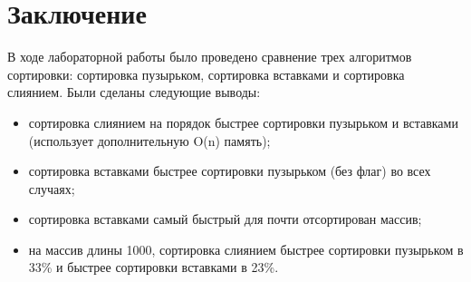 \chapter*{Заключение}

В ходе лабораторной работы было проведено сравнение трех алгоритмов сортировки:
сортировка пузырьком, сортировка вставками и сортировка слиянием.
Были сделаны следующие выводы:

\begin{itemize}
    \item сортировка слиянием на порядок быстрее сортировки пузырьком и
    вставками (использует дополнительную O(n) память);
    \item сортировка вставками быстрее сортировки пузырьком (без флаг)
    во всех случаях;
    \item сортировка вставками самый быстрый для почти отсортирован массив;
    \item на массив длины 1000, сортировка слиянием быстрее сортировки
    пузырьком в 33\% и быстрее сортировки вставками в 23\%.
\end{itemize}
